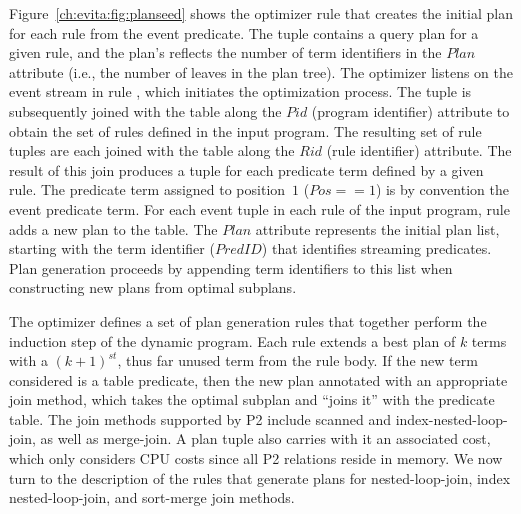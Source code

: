 Figure~\ref{ch:evita:fig:planseed} shows the optimizer rule that creates the
initial plan for each rule from the event predicate.  The  tuple
contains a query plan for a given rule, and the plan's  reflects the
number of term identifiers in the $Plan$ attribute (i.e., the number of leaves
in the plan tree).  The optimizer listens on the  event stream
in rule , which initiates the optimization process.  The
 tuple is subsequently joined with the  table along
the $Pid$ (program identifier) attribute to obtain the set of rules defined in
the input program.  The resulting set of rule tuples are each joined with the
 table along the $Rid$ (rule identifier) attribute.  The result
of this join produces a tuple for each predicate term defined by a given rule.
The predicate term assigned to position~$1$ ($Pos == 1$) is by convention the
event predicate term.  For each event  tuple in each rule of the
input program, rule  adds a new plan to the  table.  The
$Plan$ attribute represents the initial plan list, starting with the term
identifier ($PredID$) that identifies streaming predicates.  Plan generation
proceeds by appending term identifiers to this list when constructing new plans
from optimal subplans.

The \OVERLOG optimizer defines a set of plan generation rules that together
perform the induction step of the dynamic program.  Each rule extends a best
plan of $k$ terms with a $(k+1)^{st}$, thus far unused term from the rule body.
If the new term considered is a table predicate, then the new plan
annotated with an appropriate join method, which takes the optimal subplan and
``joins it'' with the predicate table.  The join methods supported by P2
include scanned and index-nested-loop-join, as well as merge-join.  A plan
tuple also carries with it an associated cost, which only considers CPU costs
since all P2 relations reside in memory.  We now turn to the description of the
rules that generate plans for nested-loop-join, index nested-loop-join, and
sort-merge join methods.

